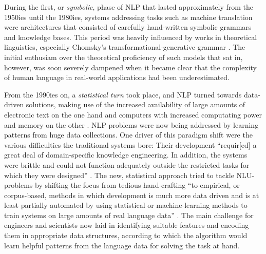 
During the first, or \emph{symbolic}, phase of NLP that lasted approximately from the 1950ies
until the 1980ies, systems addressing tasks such as machine translation were architectures that
consisted of carefully hand-written symbolic grammars and knowledge bases. This period was heavily
influenced by works in theoretical linguistics, especially Chomsky's transformational-generative
grammar \citep{chomsky2009syntactic,chomsky2014aspects}. The initial enthusiam over the theoretical
proficiency of such models that sat in, however, was soon severely dampened when it became clear
that the complexity of human language in real-world applications had been underestimated.


From the 1990ies on, a \emph{statistical turn} took place, and NLP turned towards
data-driven solutions, making use of the increased availability of large amounts of
electronic text on the one hand and computers with increased computating power and
memory on the other \citep{liddy2001natural}.
NLP problems were now being addressed by learning patterns from huge data collections. One
driver of this paradigm shift were the various difficulties the traditional systems bore: Their
development ``requir[ed] a great deal of domain-specific knowledge engineering. In addition,
the systems were brittle and could not function adequately outside the restricted tasks for
which they were designed'' \citep[p.~13]{brill1997overview}. The new, statistical {\color{red}
approach} tried to tackle NLU-problems by shifting the focus from tedious hand-crafting ``to
empirical, or corpus-based, methods in which development is much more data driven and is at
least partially automated by using statistical or machine-learning methods to train systems
on large amounts of real language data'' \citep[p.~13]{brill1997overview}. The main challenge
for engineers and scientists now laid in identifying suitable features and encoding them in
appropriate data structures, according to which the algorithm would learn helpful patterns from
the language data for solving the task at hand.


